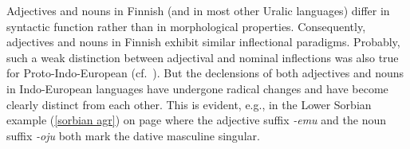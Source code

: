 Adjectives and nouns in Finnish (and in most other Uralic languages) differ in syntactic function rather than in morphological properties. Consequently, adjectives and nouns in Finnish exhibit similar inflectional paradigms. Probably, such a weak distinction between adjectival and nominal inflections was also true for Proto\hyp{}Indo-European (cf.~\citealt[80]{comrie1998}). But the declensions of both adjectives and nouns in Indo-European languages have undergone radical changes and have become clearly distinct from each other. This is evident, e.g., in the Lower Sorbian example (\ref{sorbian agr}) on page \pageref{sorbian agr} where the adjective suffix \textit{-emu} and the noun suffix \textit{-oju} both mark the dative masculine singular.

